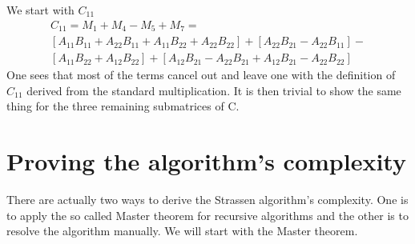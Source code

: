 \documentclass[11pt,a4paper]{article}
\begin{document}
\newline
\newline
We start with $C_{11}$
\newline
\begin{multline}
    C_{11} = M_1+M_4-M_5+M_7 =\\
    [A_{11}B_{11}+A_{22}B_{11}+A_{11}B_{22}+A_{22}B_{22}] +
    [A_{22}B_{21}-A_{22}B_{11}] -\\
    [A_{11}B_{22}+A_{12}B_{22}] +
    [A_{12}B_{21}-A_{22}B_{21}+A_{12}B_{21}-A_{22}B_{22}]
\end{multline}
\newline
One sees that most of the terms cancel out and leave one with the definition of $C_{11}$ derived from the standard multiplication. It is then trivial to show the same thing for the three remaining submatrices of C.




\newpage
\section{Proving the algorithm's complexity}
There are actually two ways to derive the Strassen algorithm's complexity. One is to apply the so called Master theorem for recursive algorithms and the other is to resolve the algorithm manually. We will start with the Master theorem.
\newline
\end{document}
